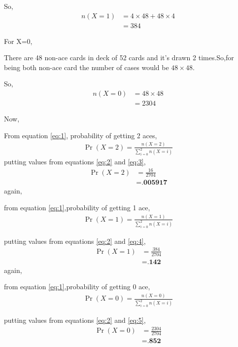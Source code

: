 \documentclass[journal,12pt,twocolumn]{IEEEtran}
\providecommand{\brak}[1]{\ensuremath{\left(#1\right)}}
\begin{document}
So,
\begin{align}
\label{eq:4}
n\brak{X = 1}&=4\times48+48\times4        \nonumber \\
&=384
\end{align}

For X=0,

There are 48 non-ace cards in deck of 52 cards and it's drawn 2 times.So,for being both non-ace card the number of cases would be $48\times48$. 

So,
\begin{align}
\label{eq:5}
n\brak{X = 0}&=48\times48              \nonumber\\
&=2304
\end{align}

Now,

From equation \eqref{eq:1}, probability of getting 2 aces,
\begin{align}
\Pr\brak{X = 2} = \frac{n\brak{X = 2}}{\sum_{i=0}^2 n\brak{X = i}}
\end{align}
putting values from equations \eqref{eq:2} and \eqref{eq:3},
\begin{align}
\Pr\brak{X = 2}&=\frac{16}{2704}  \\
&=\textbf{.005917}
\end{align}
again,

from equation \eqref{eq:1},probability of getting 1 ace,
\begin{align}
\Pr\brak{X = 1} = \frac{n\brak{X = 1}}{\sum_{i=0}^2 n\brak{X = i}}
\end{align}

putting values from equations \eqref{eq:2} and \eqref{eq:4},
\begin{align}
\Pr\brak{X = 1}&=\frac{384}{2704}  \\
&=\textbf{.142}
\end{align}
again,

from equation \eqref{eq:1},probability of getting 0 ace,
\begin{align}
\Pr\brak{X = 0} = \frac{n\brak{X = 0}}{\sum_{i=0}^2 n\brak{X = i}}
\end{align}

putting values from equations \eqref{eq:2} and \eqref{eq:5},
\begin{align}
\Pr\brak{X = 0}&=\frac{2304}{2704}  \\
&=\textbf{.852}
\end{align}

	\begin{table}[ht!]
		
		\centering
		\vspace{5pt}
		\caption{}
		\label{table:1}	
	\end{table}
\end{document}
